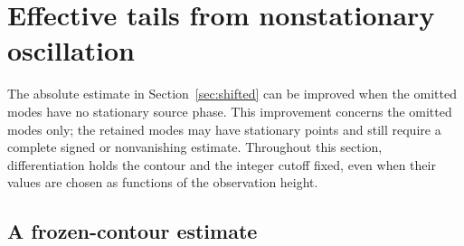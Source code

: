 \section{Effective tails from nonstationary oscillation}\label{sec:effective}

The absolute estimate in Section~\ref{sec:shifted} can be improved when
the omitted modes have no stationary source phase. This improvement
concerns the omitted modes only; the retained modes may have stationary
points and still require a complete signed or nonvanishing estimate.
Throughout this section, differentiation holds the contour and the
integer cutoff fixed, even when their values are chosen as functions
of the observation height.

\subsection{A frozen-contour estimate}

